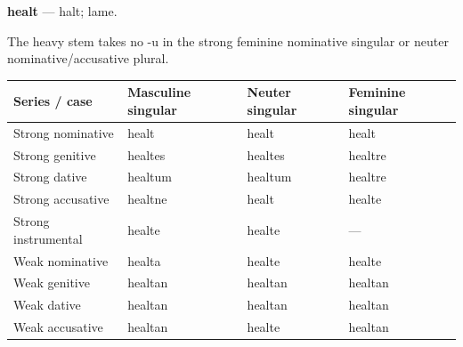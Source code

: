 \par\begin{minipage}{\linewidth}\raggedright
\textbf{healt} — halt; lame.

The heavy stem takes no -u in the strong feminine nominative singular or neuter nominative/\allowbreak{}accusative plural.

\par\begingroup
\fontsize{10.5}{13.2}\selectfont
\setlength{\LTleft}{0pt}\setlength{\LTright}{\fill}
\noindent
\begin{tabular}{@{}>{\raggedright\arraybackslash}p{34.062mm}>{\raggedright\arraybackslash}p{29.341mm}>{\raggedright\arraybackslash}p{25.069mm}>{\raggedright\arraybackslash}p{27.092mm}@{}}
\toprule
\textbf{Series /\allowbreak{} case} & \textbf{Masculine singular} & \textbf{Neuter singular} & \textbf{Feminine singular} \\
\midrule
Strong nominative & healt & healt & healt \\
Strong genitive & healtes & healtes & healtre \\
Strong dative & healtum & healtum & healtre \\
Strong accusative & healtne & healt & healte \\
Strong instrumental & healte & healte & — \\
Weak nominative & healta & healte & healte \\
Weak genitive & healtan & healtan & healtan \\
Weak dative & healtan & healtan & healtan \\
Weak accusative & healtan & healte & healtan \\
\bottomrule
\end{tabular}
\par\endgroup
\end{minipage}\par
\par\addvspace{5pt}
\par\begingroup
\fontsize{10.5}{13.2}\selectfont
\setlength{\LTleft}{0pt}\setlength{\LTright}{\fill}
\noindent
